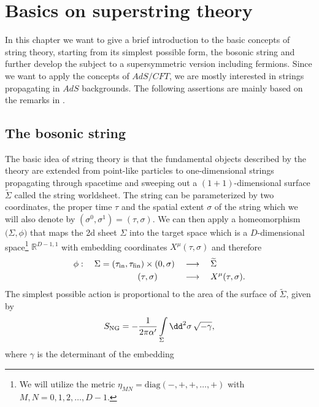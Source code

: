 \chapter{Basics on superstring theory}
In this chapter we want to give a brief introduction to the basic concepts of string theory, starting from its simplest possible form, the bosonic string and further develop the subject to a supersymmetric version including fermions. Since we want to apply the concepts of $AdS/CFT$, we are mostly interested in strings propagating in $AdS$ backgrounds. The following assertions are mainly based on the remarks in \cite{Polchinski:1998rq,Polchinski:1998rr,Ammon:2015wua}.
%
%
%
%
%
%
%
\section{The bosonic string}
The basic idea of string theory is that the fundamental objects described by the theory are extended from point-like particles to one-dimensional strings propagating through spacetime and sweeping out a $(1+1)$-dimensional surface $\widetilde{\Sigma}$ called the string worldsheet. The string can be parameterized by two coordinates, the proper time $\tau$ and the spatial extent $\sigma$ of the string which we will also denote by $(\sigma^{0},\sigma^{1})=(\tau,\sigma)$. We can then apply a homeomorphism $\big(\Sigma,\phi)$ that maps the 2d sheet $\Sigma$ into the target space which is a $D$-dimensional  space\footnote{We will utilize the metric $\eta_{MN}=\text{diag}(-,+,+,\ldots,+)$ with $M,N=0,1,2,\ldots,D-1.$} $\mathbb{R}^{D-1,1}$ with embedding coordinates $X^{\mu}(\tau,\sigma)$ and therefore
%
%
\begin{equation}
\begin{alignedat}{3}
\phi :\quad  \Sigma = (\tau_{\rm in},\tau_{\rm fin}) \times (0,\sigma) \quad &\longrightarrow \quad \widetilde{\Sigma} \\
(\tau,\sigma) \qquad\quad &\longrightarrow \quad X^{\mu}(\tau,\sigma).
\end{alignedat}
\end{equation}
%
%
The simplest possible action is proportional to the area of the surface of $\widetilde{\Sigma}$, given by
%
%
\begin{equation}
S_{\rm NG} = -\frac{1}{2\pi\alpha'} \int\limits_{\Sigma} \dd^{2}\sigma \, \sqrt{-\gamma},
\end{equation}
%
%
where $\gamma$ is the  determinant of the embedding

